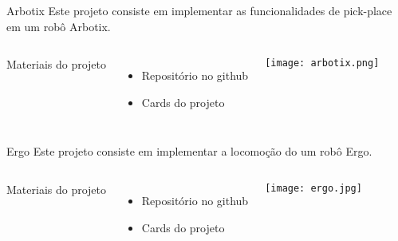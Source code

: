 \begin{frame}[t]{Arbotix} 
    Este projeto consiste em implementar as funcionalidades de pick-place em um robô Arbotix.

        \begin{columns}[c]
            Materiais do projeto
            \vspace*{0.3cm}
                \begin{itemize}
                    \item Repositório no github
                    \item Cards do projeto
                \end{itemize}
                \texttt{[image: arbotix.png]}
        \end{columns}

\end{frame}
\begin{frame}[t]{Ergo} 
    Este projeto consiste em implementar a locomoção do um robô Ergo.
    \vspace*{0.3cm}
        \begin{columns}[c]
            Materiais do projeto
            \vspace*{0.3cm}
                \begin{itemize}
                    \item Repositório no github
                    \item Cards do projeto
                \end{itemize}
                \texttt{[image: ergo.jpg]}
        \end{columns}

\end{frame}

